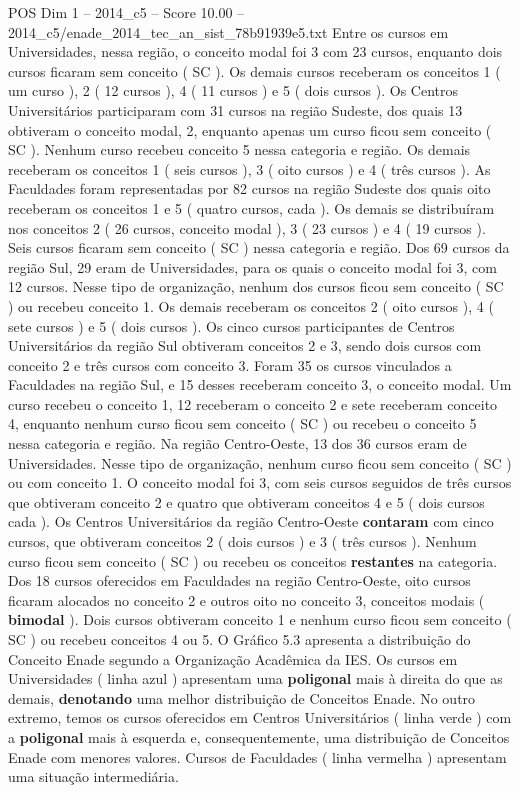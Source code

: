 \begin{textsample}{POS Dim 1 – 2014\_c5 – Score 10.00 – 2014\_c5/enade\_2014\_tec\_an\_sist\_78b91939e5.txt}
Entre os cursos em Universidades, nessa região, o conceito modal foi 3 com 23 cursos, enquanto dois cursos ficaram sem conceito ( SC ).
Os demais cursos receberam os conceitos 1 ( um curso ), 2 ( 12 cursos ), 4 ( 11 cursos ) e 5 ( dois cursos ).
Os Centros Universitários participaram com 31 cursos na região Sudeste, dos quais 13 obtiveram o conceito modal, 2, enquanto apenas um curso ficou sem conceito ( SC ).
Nenhum curso recebeu conceito 5 nessa categoria e região.
Os demais receberam os conceitos 1 ( seis cursos ), 3 ( oito cursos ) e 4 ( três cursos ).
As Faculdades foram representadas por 82 cursos na região Sudeste dos quais oito receberam os conceitos 1 e 5 ( quatro cursos, cada ).
Os demais se distribuíram nos conceitos 2 ( 26 cursos, conceito modal ), 3 ( 23 cursos ) e 4 ( 19 cursos ).
Seis cursos ficaram sem conceito ( SC ) nessa categoria e região.
Dos 69 cursos da região Sul, 29 eram de Universidades, para os quais o conceito modal foi 3, com 12 cursos.
Nesse tipo de organização, nenhum dos cursos ficou sem conceito ( SC ) ou recebeu conceito 1.
Os demais receberam os conceitos 2 ( oito cursos ), 4 ( sete cursos ) e 5 ( dois cursos ).
Os cinco cursos participantes de Centros Universitários da região Sul obtiveram conceitos 2 e 3, sendo dois cursos com conceito 2 e três cursos com conceito 3.
Foram 35 os cursos vinculados a Faculdades na região Sul, e 15 desses receberam conceito 3, o conceito modal.
Um curso recebeu o conceito 1, 12 receberam o conceito 2 e sete receberam conceito 4, enquanto nenhum curso ficou sem conceito ( SC ) ou recebeu o conceito 5 nessa categoria e região.
Na região Centro-Oeste, 13 dos 36 cursos eram de Universidades.
Nesse tipo de organização, nenhum curso ficou sem conceito ( SC ) ou com conceito 1.
O conceito modal foi 3, com seis cursos seguidos de três cursos que obtiveram conceito 2 e quatro que obtiveram conceitos 4 e 5 ( dois cursos cada ).
Os Centros Universitários da região Centro-Oeste \textbf{contaram} com cinco cursos, que obtiveram conceitos 2 ( dois cursos ) e 3 ( três cursos ).
Nenhum curso ficou sem conceito ( SC ) ou recebeu os conceitos \textbf{restantes} na categoria.
Dos 18 cursos oferecidos em Faculdades na região Centro-Oeste, oito cursos ficaram alocados no conceito 2 e outros oito no conceito 3, conceitos modais ( \textbf{bimodal} ).
Dois cursos obtiveram conceito 1 e nenhum curso ficou sem conceito ( SC ) ou recebeu conceitos 4 ou 5.
O Gráfico 5.3 apresenta a distribuição do Conceito Enade segundo a Organização Acadêmica da IES.
Os cursos em Universidades ( linha azul ) apresentam uma \textbf{poligonal} mais à direita do que as demais, \textbf{denotando} uma melhor distribuição de Conceitos Enade.
No outro extremo, temos os cursos oferecidos em Centros Universitários ( linha verde ) com a \textbf{poligonal} mais à esquerda e, consequentemente, uma distribuição de Conceitos Enade com menores valores.
Cursos de Faculdades ( linha vermelha ) apresentam uma situação intermediária.

\end{textsample}

